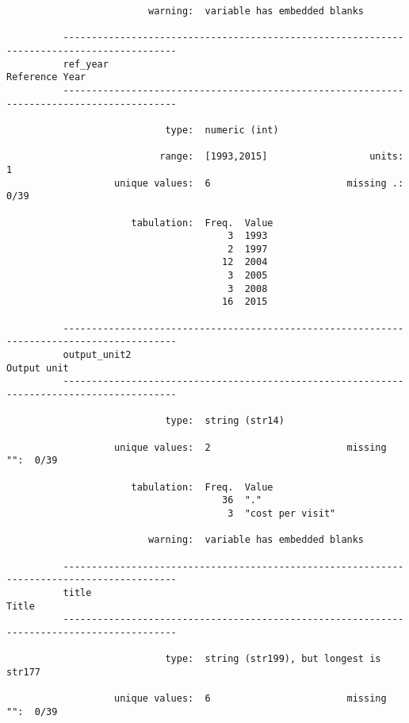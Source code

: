 \documentclass{article}
\begin{document}
\begin{verbatim}
                         warning:  variable has embedded blanks
          
          ------------------------------------------------------------------------------------------
          ref_year                                                                    Reference Year
          ------------------------------------------------------------------------------------------
          
                            type:  numeric (int)
          
                           range:  [1993,2015]                  units:  1
                   unique values:  6                        missing .:  0/39
          
                      tabulation:  Freq.  Value
                                       3  1993
                                       2  1997
                                      12  2004
                                       3  2005
                                       3  2008
                                      16  2015
          
          ------------------------------------------------------------------------------------------
          output_unit2                                                                   Output unit
          ------------------------------------------------------------------------------------------
          
                            type:  string (str14)
          
                   unique values:  2                        missing "":  0/39
          
                      tabulation:  Freq.  Value
                                      36  "."
                                       3  "cost per visit"
          
                         warning:  variable has embedded blanks
          
          ------------------------------------------------------------------------------------------
          title                                                                                Title
          ------------------------------------------------------------------------------------------
          
                            type:  string (str199), but longest is str177
          
                   unique values:  6                        missing "":  0/39
          

\end{verbatim}
\end{document}
